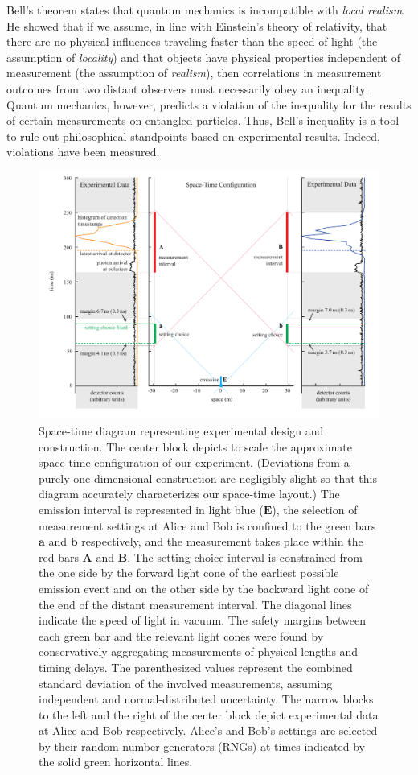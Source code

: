 \documentclass[superscriptaddress,twocolumn]{revtex4-1}
\begin{document}
Bell's theorem states that quantum mechanics is incompatible with \textit{local realism}.  He showed that if we assume, in line with Einstein's theory of relativity, that there are no physical influences traveling faster than the speed of light (the assumption of \textit{locality}) and that objects have physical properties independent of measurement (the assumption of \textit{realism}), then correlations in measurement outcomes from two distant observers must necessarily obey an inequality  \cite{Bell1964}. Quantum mechanics, however, predicts  a violation of the inequality for the results of certain measurements on entangled particles. Thus, Bell’s inequality is a tool to rule out philosophical standpoints based on experimental results. Indeed, violations have been measured.

\begin{figure}[htp]
	\includegraphics[width=0.9\linewidth]{figure2_v6.pdf}
	\caption{Space-time diagram representing experimental design and construction. The center block depicts to scale the approximate space-time configuration of our experiment. (Deviations from a purely one-dimensional construction are negligibly slight so that this diagram accurately characterizes our space-time layout.) The emission interval is represented in light blue ($\textbf{E}$), the selection of measurement  settings at Alice and Bob is confined to the green bars $\textbf{a}$ and $\textbf{b}$ respectively, and the measurement takes place within the red bars $\textbf{A}$ and $\textbf{B}$.
	The setting choice interval is constrained from the one side by the forward light cone of the earliest possible emission event and on the other side by the backward light cone of the end of the distant measurement interval. The diagonal lines indicate the speed of light in vacuum. The safety margins between each green bar and the relevant light cones were found by conservatively aggregating measurements of physical lengths and timing delays. The parenthesized values represent the combined standard deviation of the involved measurements, assuming independent and normal-distributed uncertainty. The narrow blocks to the left and the right of the center block depict experimental data at Alice and Bob respectively. Alice's and Bob's settings are selected by their random number generators (RNGs) at times indicated by the solid green horizontal lines. 
}
\end{figure}
\end{document}

